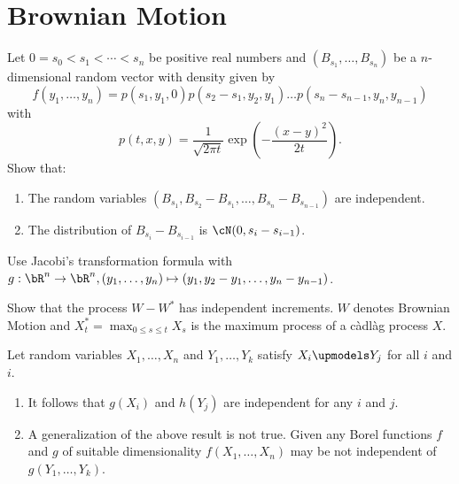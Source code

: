 
\section{Brownian Motion}

Let $0=s_0 < s_1 < \cdots < s_n$ be positive real numbers and $(B_{s_{1}},\dots ,B_{s_n})$ 
be a $n$-dimensional random vector with density given by
\begin{equation*}
    f(y_1,\dots ,y_n) = p(s_1, y_1, 0)p(s_2-s_1,y_2, y_1)\dots p(s_n-s_{n-1}, y_n, y_{n-1})
\end{equation*}
with 
\begin{equation*}
    p(t, x,y ) = \frac{1}{\sqrt{2\pi t}} \exp(-\frac{(x-y)^2}{2t}). 
\end{equation*}
Show that:
\begin{enumerate}
    \item The random variables $(B_{s_1}, B_{s_2}-B_{s_1},\dots ,B_{s_n}-B_{s_{n-1}})$ 
        are independent.
    \item The distribution of $B_{s_i}-B_{s_{i-1}}$ is $\cN(0, s_{i}-s_{i-1})$.
\end{enumerate}

\solution Use Jacobi's transformation formula with
$g:\bR^{n}\to\bR^{n}, (y_1,\dots ,y_n)\mapsto(y_1, y_2-y_1,\dots
,y_n-y_{n-1})$. 

 Show that the process $W
- W^*$ has independent increments. $W$ denotes Brownian Motion and $X^*_t=
\max_{0 \leq s \leq t} X_s$ is the maximum process of a c\`adl\`ag process $X$.

 Let random variables
$X_1,\ldots,X_n$ and $Y_1,\ldots,Y_k$ satisfy $X_i \upmodels Y_j$ for all $i$
and $i$.
\begin{enumerate}
    \item It follows that $g(X_i)$ and $h(Y_j)$ are independent for any $i$ and
        $j$.
    \item A generalization of the above result is not true. Given any Borel
        functions $f$ and $g$ of suitable dimensionality $f(X_1,\ldots,X_n)$
        may be not independent of $g(Y_1,\ldots,Y_k)$.
\end{enumerate}



